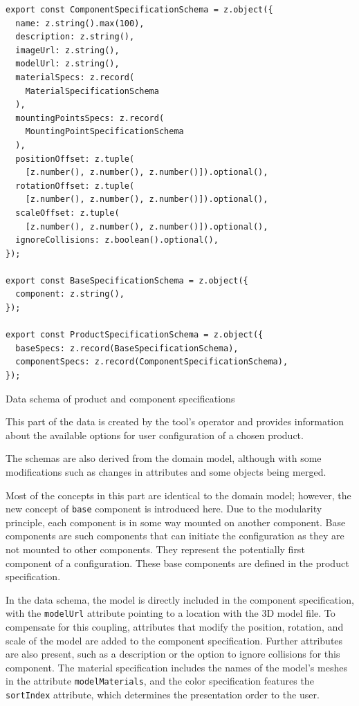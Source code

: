 \begin{listing}[h]
\begin{verbatim}
export const ComponentSpecificationSchema = z.object({
  name: z.string().max(100),
  description: z.string(),
  imageUrl: z.string(),
  modelUrl: z.string(),
  materialSpecs: z.record(
    MaterialSpecificationSchema
  ),
  mountingPointsSpecs: z.record(
    MountingPointSpecificationSchema
  ),
  positionOffset: z.tuple(
    [z.number(), z.number(), z.number()]).optional(),
  rotationOffset: z.tuple(
    [z.number(), z.number(), z.number()]).optional(),
  scaleOffset: z.tuple(
    [z.number(), z.number(), z.number()]).optional(),
  ignoreCollisions: z.boolean().optional(),
});

export const BaseSpecificationSchema = z.object({
  component: z.string(),
});

export const ProductSpecificationSchema = z.object({
  baseSpecs: z.record(BaseSpecificationSchema),
  componentSpecs: z.record(ComponentSpecificationSchema),
});
\end{verbatim}
\caption{Data schema of product and component specifications}
\label{lisiting:schema-componentspecification}
\end{listing}

This part of the data is created by the tool's operator and provides information about the available options for user configuration of a chosen product.

The schemas are also derived from the domain model, although with some modifications such as changes in attributes and some objects being merged.

Most of the concepts in this part are identical to the domain model; however, the new concept of \texttt{base} component is introduced here. Due to the modularity principle, each component is in some way mounted on another component. Base components are such components that can initiate the configuration as they are not mounted to other components. They represent the potentially first component of a configuration. These base components are defined in the product specification.

In the data schema, the model is directly included in the component specification, with the \texttt{modelUrl} attribute pointing to a location with the 3D model file. To compensate for this coupling, attributes that modify the position, rotation, and scale of the model are added to the component specification. Further attributes are also present, such as a description or the option to ignore collisions for this component. The material specification includes the names of the model's meshes in the attribute \texttt{modelMaterials}, and the color specification features the \texttt{sortIndex} attribute, which determines the presentation order to the user.


